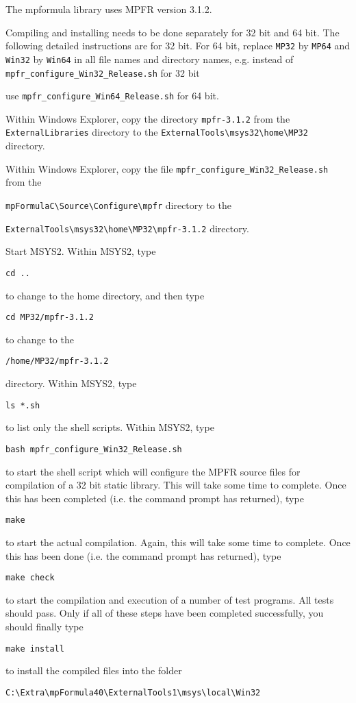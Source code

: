 The mpformula library uses MPFR version 3.1.2.


\vpara
Compiling and installing needs to be done separately for 32 bit and 64 bit. The following detailed instructions are for 32 bit. For 64 bit, replace \verb|MP32| by \verb|MP64| and \verb|Win32| by  \verb|Win64| in all file names and directory names, e.g. instead of \verb|mpfr_configure_Win32_Release.sh| for 32 bit

use \verb|mpfr_configure_Win64_Release.sh| for 64 bit.

\vpara
Within Windows Explorer, copy the directory \verb|mpfr-3.1.2|  from the \verb|ExternalLibraries|
directory to the \verb|ExternalTools\msys32\home\MP32| directory. 

\vpara
Within Windows Explorer, copy the file \verb|mpfr_configure_Win32_Release.sh|  from the

\verb|mpFormulaC\Source\Configure\mpfr| directory to the 

\verb|ExternalTools\msys32\home\MP32\mpfr-3.1.2| directory.  


\vpara
Start MSYS2. Within MSYS2, type
\begin{verbatim}
cd ..
\end{verbatim}
to change to the home directory, and then type 
\begin{verbatim}
cd MP32/mpfr-3.1.2
\end{verbatim}
to change to the
\begin{verbatim}
/home/MP32/mpfr-3.1.2
\end{verbatim}
directory. Within MSYS2, type
\begin{verbatim}
ls *.sh
\end{verbatim}
to list only the shell scripts. Within MSYS2, type
\begin{verbatim}
bash mpfr_configure_Win32_Release.sh
\end{verbatim}
to start the shell script which will configure the MPFR source files for compilation of a 32 bit static library. This will take some time to complete. Once this has been completed (i.e. the command prompt has returned), type
\begin{verbatim}
make
\end{verbatim}
to start the actual compilation. Again, this will take some time to complete. Once this has been done (i.e. the command prompt has returned), type
\begin{verbatim}
make check
\end{verbatim}
to start the compilation and execution of a number of test programs. All tests should pass. Only if all of these steps have been completed successfully, you should finally type
\begin{verbatim}
make install
\end{verbatim}
to install the compiled files into the folder
\begin{verbatim}
C:\Extra\mpFormula40\ExternalTools1\msys\local\Win32
\end{verbatim}




